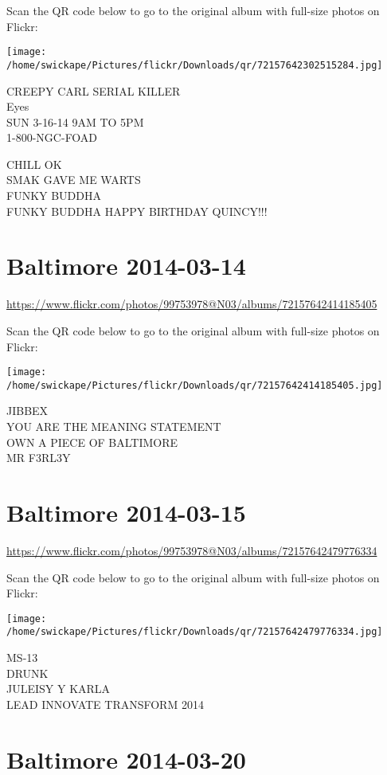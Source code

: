 \documentclass[10pt,letterpaper]{article}
\begin{document}
Scan the QR code below to go to the original album with full-size photos on Flickr:

\texttt{[image: /home/swickape/Pictures/flickr/Downloads/qr/72157642302515284.jpg]}


CREEPY CARL SERIAL KILLER\\
Eyes\\
SUN 3{-}16{-}14 9AM TO 5PM\\
1{-}800{-}NGC{-}FOAD

CHILL OK\\
SMAK GAVE ME WARTS\\
FUNKY BUDDHA\\
FUNKY BUDDHA HAPPY BIRTHDAY QUINCY!!!


\section*{Baltimore 2014-03-14}

\url{https://www.flickr.com/photos/99753978@N03/albums/72157642414185405}

Scan the QR code below to go to the original album with full-size photos on Flickr:

\texttt{[image: /home/swickape/Pictures/flickr/Downloads/qr/72157642414185405.jpg]}


JIBBEX\\
YOU ARE THE MEANING STATEMENT\\
OWN A PIECE OF BALTIMORE\\
MR F3RL3Y


\section*{Baltimore 2014-03-15}

\url{https://www.flickr.com/photos/99753978@N03/albums/72157642479776334}

Scan the QR code below to go to the original album with full-size photos on Flickr:

\texttt{[image: /home/swickape/Pictures/flickr/Downloads/qr/72157642479776334.jpg]}


MS{-}13\\
DRUNK\\
JULEISY Y KARLA\\
LEAD INNOVATE TRANSFORM 2014


\section*{Baltimore 2014-03-20}
\end{document}
